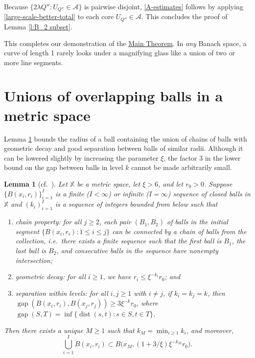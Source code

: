 \documentclass[12pt]{amsart}
\numberwithin{equation}{section}
\theoremstyle{plain}
\newtheorem{lemma}[theorem]{Lemma}
\theoremstyle{definition}
\def\XX{{\mathbb{X}}}
\newcommand{\dist}{\mathop\mathrm{dist}\nolimits}
\newcommand{\gap}{\mathop\mathrm{gap}\nolimits}
\numberwithin{figure}{section}
\begin{document}
Because $\{2\lambda Q'':U_{Q''}\in \mathcal{A}\}$ is pairwise disjoint, \eqref{A-estimates} follows by applying \eqref{large-scale-better-total} to each core $U_{Q''}\in \mathcal{A}$. This concludes the proof of Lemma \ref{l:B_2 subset}.

\smallskip

This completes our demonstration of the \hyperref[t:main]{Main Theorem}. In \emph{any} Banach space, a curve of length 1 rarely looks under a magnifying glass like a union of two or more line segments.

\appendix

\section{Unions of overlapping balls in a metric space}

Lemma \ref{union-ball-chains} bounds the radius of a ball containing the union of chains of balls with geometric decay and good separation between balls of similar radii.  Although it can be lowered slightly by increasing the parameter $\xi$, the factor 3 in the lower bound on the gap between balls in level $k$ cannot be made arbitrarily small.

\begin{lemma}[{cf.~\cite[Lemma 2.16]{Schul-AR}}] \label{union-ball-chains} Let $\XX$ be a metric space, let $\xi>6$, and let $r_0>0$. Suppose $\{B(x_i,r_i)\}_{i=1}^{I}$ is a finite ($I<\infty$) or infinite ($I=\infty$) sequence of closed balls in $\XX$ and $(k_i)_{i=1}^I$ is a sequence of integers bounded from below such that \begin{enumerate}
\item[(i)] chain property: for all $j\geq 2$, each pair $(B_1,B_2)$ of balls in the initial segment $\{B(x_i,r_i):1\leq i\leq j\}$ can be connected by a chain of balls from the collection, i.e.~there exists a finite sequence such that the first ball is $B_1$, the last ball is $B_2$, and consecutive balls in the sequence have nonempty intersection;
\item[(ii)] geometric decay: for all $i\geq 1$, we have $r_i\leq \xi^{-k_i}r_0$; and
\item[(iii)] separation within levels: for all $i,j\geq 1$ with $i\neq j$, if $k_i=k_j=k$, then $\gap(B(x_i,r_i),B(x_j,r_j))\geq 3\xi^{-k}r_0$, where $\gap(S,T)=\inf\{\dist(s,t):s\in S,t\in T\}$.
\end{enumerate} Then there exists a unique $M\geq 1$ such that $k_M=\min_{i\geq 1} k_i$, and moreover, \begin{equation}\label{e:union-location} \textstyle\bigcup_{i=1}^I B(x_i,r_i)\subset B\big(x_M,(1+3/\xi)\xi^{-k_M}r_0\big).\end{equation}\end{lemma}
\end{document}
